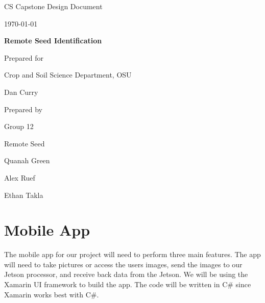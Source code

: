 \documentclass[onecolumn, draftclsnofoot,10pt, compsoc]{IEEEtran}
\def \CapstoneTeamName{		Remote Seed}
\def \CapstoneTeamNumber{		12}
\def \GroupMemberOne{			Quanah Green}
\def \GroupMemberTwo{			Alex Ruef}
\def \GroupMemberThree{			Ethan Takla}
\def \CapstoneProjectName{		Remote Seed Identification}
\def \CapstoneSponsorCompany{	Crop and Soil Science Department, OSU}
\def \CapstoneSponsorPerson{		Dan Curry}
\def \DocType{		%
				Design Document
				}
\newcommand{\NameSigPair}[1]{\par
\makebox[2.75in][r]{#1} \hfil 	\makebox[3.25in]{\makebox[2.25in]{\hrulefill} \hfill		\makebox[.75in]{\hrulefill}}
\par\vspace{-12pt} \textit{\tiny\noindent
\makebox[2.75in]{} \hfil		\makebox[3.25in]{\makebox[2.25in][r]{Signature} \hfill	\makebox[.75in][r]{Date}}}}
\renewcommand{\NameSigPair}[1]{#1}
\begin{document}
\begin{titlepage}
    \begin{singlespace}
        \hfill 
        \par\vspace{.2in}
        \centering
        \scshape{
            \huge CS Capstone \DocType \par
            {\large\today}\par
            \vspace{.5in}
            \textbf{\Huge\CapstoneProjectName}\par
            \vfill
            {\large Prepared for}\par
            \Huge \CapstoneSponsorCompany\par
            \vspace{5pt}
            {\Large\NameSigPair{\CapstoneSponsorPerson}\par}
            {\large Prepared by }\par
            Group\CapstoneTeamNumber\par
            \CapstoneTeamName\par 
            \vspace{5pt}
            {\Large
                \NameSigPair{\GroupMemberOne}\par
                \NameSigPair{\GroupMemberTwo}\par
                \NameSigPair{\GroupMemberThree}\par
            }
            \vspace{20pt}
        }
        \begin{abstract}
        		

        \end{abstract}     
    \end{singlespace}
\end{titlepage}
\newpage
{}
\tableofcontents
\clearpage
\section{Mobile App}
	The mobile app for our project will need to perform three main features.
	The app will need to take pictures or access the users images, send the images to our Jetson processor, and receive back data from the Jetson.
	We will be using the Xamarin UI framework to build the app.
	The code will be written in C\# since Xamarin works best with C\#.
\end{document}
